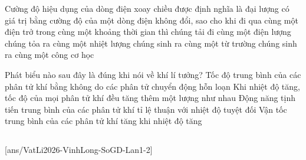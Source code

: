	\begin{ex}%
		Cường độ hiệu dụng của dòng điện xoay chiều được định nghĩa là đại lượng có giá trị bằng cường độ của một dòng điện không đổi, sao cho khi đi qua cùng một điện trở trong cùng một khoảng thời gian thì
		\choice
		{chúng tải đi cùng một điện lượng}
		{\True chúng tỏa ra cùng một nhiệt lượng}
		{chúng sinh ra cùng một từ trường}
		{chúng sinh ra cùng một công cơ học}
	\end{ex}

	\begin{ex}%
		Phát biểu nào sau đây là đúng khi nói về khí lí tưởng?
		\choice
		{Tốc độ trung bình của các phân tử khí bằng không do các phân tử chuyển động hỗn loạn}
		{Khi nhiệt độ tăng, tốc độ của mọi phân tử khí đều tăng thêm một lượng như nhau}
		{\True Động năng tịnh tiến trung bình của các phân tử khí tỉ lệ thuận với nhiệt độ tuyệt đối}
		{Vận tốc trung bình của các phân tử khí tăng khi nhiệt độ tăng}
	\end{ex}

	\subsection*{}
	\setcounter{ex}{0}
	[ans/VatLi2026-VinhLong-SoGD-Lan1-2]

